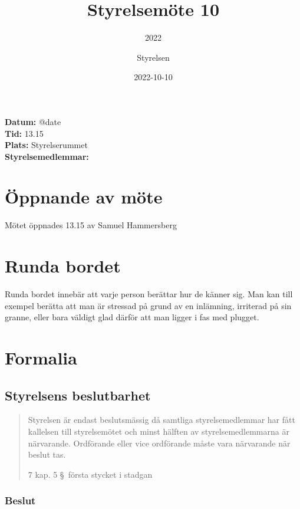 \documentclass[protokoll]{dvd}
\begin{document}
\title{Styrelsemöte 10}
\subtitle{2022}
\author{Styrelsen}
\date{2022-10-10}

\textbf{Datum:} \csname @date\endcsname\\
\textbf{Tid:} 13.15 \\
\textbf{Plats:} Styrelserummet\\
\textbf{Styrelsemedlemmar:}
\begin{närvarande_förtroendevalda}
\end{närvarande_förtroendevalda}

\section{Öppnande av möte}

Mötet öppnades 13.15 av Samuel Hammersberg

\section{Runda bordet}

Runda bordet innebär att varje person berättar hur de känner sig.
Man kan till exempel berätta att man är stressad på grund av en inlämning,
irriterad på sin granne, eller bara väldigt glad därför att man ligger i fas med plugget.

\section{Formalia}

\subsection{Styrelsens beslutbarhet}

\blockquote[7 kap. 5 \S~första stycket i stadgan][]{
    Styrelsen är endast beslutsmässig då samtliga styrelsemedlemmar har
    fått kallelsen till styrelsemötet och minst hälften av styrelsemedlemmarna är närvarande.
    Ordförande eller vice ordförande måste vara närvarande när beslut tas.
}

\subsubsection*{Beslut}
\end{document}
